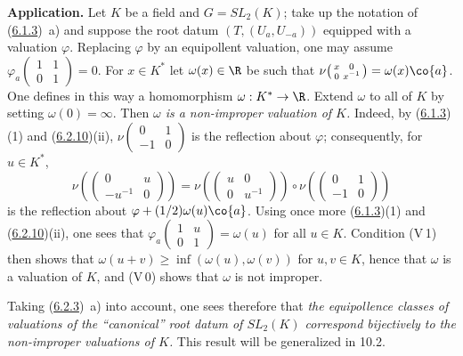\documentclass[12pt,a4paper,oneside,english]{smfart}
\newcommand{\btref}[1]{\hyperlink{bt:#1}{#1}}
\theoremstyle{definition}
\theoremstyle{bt}
\begin{document}
\medskip
\noindent\textbf{Application.} Let $K$ be a field and $G=SL_2(K)$; take up the
notation of (\btref{6.1.3})~a) and suppose the root datum $(T,(U_a,U_{-a}))$ equipped with
a valuation $\varphi$. Replacing $\varphi$ by an equipollent valuation, one may
assume $\varphi_a\!\left(\begin{smallmatrix}1&1\\0&1\end{smallmatrix}\right)=0$.
For $x\in K^{*}$ let $\omega(x)\in\R$ be such that
$\nu\!\left(\begin{smallmatrix}x&0\\0&x^{-1}\end{smallmatrix}\right)=\omega(x)\co{a}$.
One defines in this way a homomorphism $\omega:K^{*}\to\R$. Extend $\omega$ to all
of $K$ by setting $\omega(0)=\infty$. Then \emph{$\omega$ is a non-improper
valuation of $K$.} Indeed, by (\btref{6.1.3})(1) and (\btref{6.2.10})(ii),
$\nu\!\left(\begin{smallmatrix}0&1\\-1&0\end{smallmatrix}\right)$ is the reflection
about $\varphi$; consequently, for $u\in K^{*}$,
\[ \nu\!\left(\begin{pmatrix}0&u\\-u^{-1}&0\end{pmatrix}\right)
 =\nu\!\left(\begin{pmatrix}u&0\\0&u^{-1}\end{pmatrix}\right)\circ
   \nu\!\left(\begin{pmatrix}0&1\\-1&0\end{pmatrix}\right) \]
is the reflection about $\varphi+(1/2)\omega(u)\co{a}$. Using once more (\btref{6.1.3})(1)
and (\btref{6.2.10})(ii), one sees that
$\varphi_a\!\left(\begin{smallmatrix}1&u\\0&1\end{smallmatrix}\right)=\omega(u)$
for all $u\in K$. Condition (V\,1) then shows that
$\omega(u+v)\ge\inf(\omega(u),\omega(v))$ for $u,v\in K$, hence that $\omega$ is a
valuation of $K$, and (V\,0) shows that $\omega$ is not improper.

Taking (\btref{6.2.3})~a) into account, one sees therefore that \emph{the equipollence
classes of valuations of the ``canonical'' root datum of $SL_2(K)$ correspond
bijectively to the non-improper valuations of $K$.} This result will be generalized
in 10.2.
\end{document}
